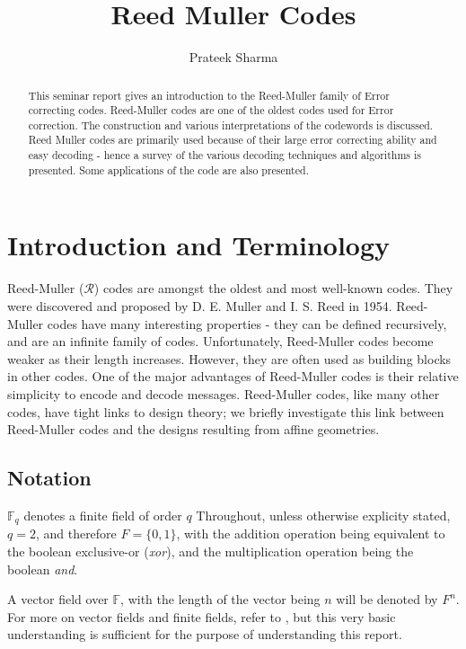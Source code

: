 \documentclass{article}
\title{Reed Muller Codes}
\author{Prateek Sharma}
\newcommand{\F}{\ensuremath{\mathbb{F}}}
\begin{document}
\maketitle

\begin{abstract} 
This seminar report gives an introduction to the Reed-Muller family of Error correcting codes. Reed-Muller codes are one of the oldest codes used for Error correction. The construction and various interpretations of the codewords is discussed. Reed Muller codes are primarily used because of their large error correcting ability and easy decoding - hence a survey of the various decoding techniques and algorithms is presented. Some applications of the code are also presented.
\end{abstract}


\section {Introduction and Terminology}

Reed-Muller ($\mathcal{R}$) codes are amongst the oldest and most well-known codes. They were discovered and proposed by D. E. Muller and I. S. Reed in 1954. \cite{original}
Reed-Muller codes have many interesting properties - they can be defined recursively, and are an infinite family of codes.
Unfortunately, Reed-Muller codes become weaker as their length increases. However, they are often used as building blocks in other codes.
One of the major advantages of Reed-Muller codes is their relative simplicity to encode and decode messages.
Reed-Muller codes, like many other codes, have tight links to design theory; we briefly investigate this link between Reed-Muller codes and the designs resulting from affine geometries.

\subsection{Notation}
$\F _q$ denotes a finite field of order $q$
Throughout, unless otherwise explicity stated, $q=2$, and therefore $F=\{0,1\}$, with the addition operation being equivalent to the boolean exclusive-or (\emph{xor}), and the multiplication operation being the boolean \emph{and}.

A vector field over $\F$, with the length of the vector being $n$ will be denoted by $F^n$. For more on vector fields and finite fields, refer to \cite{vectors}, but this very basic understanding is sufficient for the purpose of understanding this report.
\end{document}
